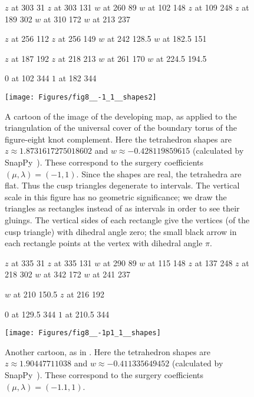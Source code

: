 \documentclass[12pt]{amsart}
\begin{document}
\begin{figure}[htbp]
\small\hair 2pt
\pinlabel $z$ at 303 31
\pinlabel $z$ at 303 131
\pinlabel $w$ at 260 89
\pinlabel $w$ at 102 148
\pinlabel $z$ at 109 248
\pinlabel $z$ at 189 302
\pinlabel $w$ at 310 172
\pinlabel $w$ at 213 237

\tiny
\pinlabel $z$ at 256 112
\pinlabel $z$ at 256 149
\pinlabel $w$ at 242 128.5
\pinlabel $w$ at 182.5 151

\pinlabel $z$ at 187 192
\pinlabel $z$ at 218 213
\pinlabel $w$ at 261 170
\pinlabel $w$ at 224.5 194.5

\pinlabel $0$ at 102 344
\pinlabel $1$ at 182 344

\endlabellist
\texttt{[image: Figures/fig8\_\_-1\_1\_\_shapes2]}
\caption{A cartoon of the image of the developing map, as applied to the triangulation of the universal cover of the boundary torus of the figure-eight knot complement.  Here the tetrahedron shapes are $z \approx 1.8731617275018602$ and $w \approx -0.428119859615$ (calculated by SnapPy~\cite{snappy}).  These correspond to the surgery coefficients $(\mu, \lambda) = (-1, 1)$.  Since the shapes are real, the tetrahedra are flat.  Thus the cusp triangles degenerate to intervals.  The vertical scale in this figure has no geometric significance; we draw the triangles as rectangles instead of as intervals in order to see their gluings.  The vertical sides of each rectangle give the vertices (of the cusp triangle) with dihedral angle zero; the small black arrow in each rectangle points at the vertex with dihedral angle $\pi$.}
\label{Fig:fig8_(-1_1)_shapes2}
\end{figure}

\begin{figure}[htbp]
\small\hair 2pt
\pinlabel $z$ at 335 31
\pinlabel $z$ at 335 131
\pinlabel $w$ at 290 89
\pinlabel $w$ at 115 148
\pinlabel $z$ at 137 248
\pinlabel $z$ at 218 302
\pinlabel $w$ at 342 172
\pinlabel $w$ at 241 237

\tiny
\pinlabel $w$ at 210 150.5
\pinlabel $z$ at 216 192

\pinlabel $0$ at 129.5 344
\pinlabel $1$ at 210.5 344

\endlabellist
\texttt{[image: Figures/fig8\_\_-1p1\_1\_\_shapes]}
\caption{Another cartoon, as in .  Here the tetrahedron shapes are $z \approx 1.90447711038$ and $w \approx -0.411335649452$ (calculated by SnapPy~\cite{snappy}).  These correspond to the surgery coefficients $(\mu, \lambda) = (-1.1, 1)$.}
\label{Fig:fig8_(-1p1_1)_shapes}
\end{figure}
\end{document}
